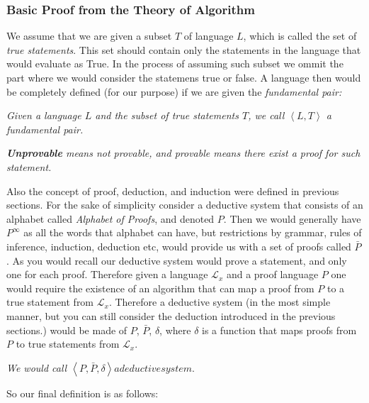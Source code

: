 \documentclass[10pt,a4paper]{article}
\newcommand{\curveL}{\mathcal{L}}
\begin{document}
                    \subsubsection{Basic Proof from the Theory of Algorithm\cite{Uspensky1995-sm}}
                        We assume that we are given a subset $T$ of language $L$, which is called the set of \textit{true statements}. This set should contain only the statements in the language that would evaluate as True. In the process of assuming such subset we ommit the part where we would consider the statemens true or false. A language then would be completely defined (for our purpose) if we are given the \textit{fundamental pair:}
                        \begin{define}
                            \textit{Given a language $L$ and the subset of true statements $T$, we call $\left<L,T\right>$ a fundamental pair.}
                        \end{define}
                        \begin{define}
                            \textit{\textbf{Unprovable} means not provable, and provable means there exist a proof for such statement.}
                        \end{define}
                        Also the concept of proof, deduction, and induction were defined in previous sections. For the sake of simplicity consider a deductive system that consists of an alphabet called \textit{Alphabet of Proofs}, and denoted $P$. Then we would generally have $P^\infty$ as all the words that alphabet can have, but restrictions by grammar, rules of inference, induction, deduction etc, would provide us with a set of proofs called $\bar P$. As you would recall our deductive system would prove a statement, and only one for each proof. Therefore given a language $\curveL_x$ and a proof language $P$ one would require the existence of an algorithm that can map a proof from $P$ to a true statement from $\curveL_x$. Therefore a deductive system (in the most simple manner, but you can still consider the deduction introduced in the previous sections.) would be made of $P$, $\bar P$, $\delta$, where $\delta$ is a function that maps proofs from $P$ to true statements from $\curveL_x$.
                        \begin{define}
                            \textit{We would call $\left<P,\bar P, \delta\right> a deductive system.$}
                        \end{define}
                        So our final definition is as follows:
\end{document}
